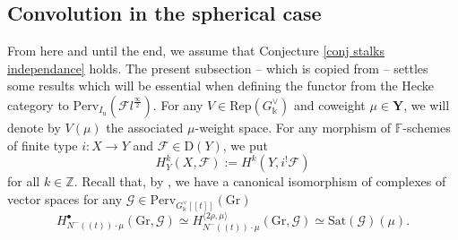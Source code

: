 \documentclass[11pt]{amsart}
\theoremstyle{plain}
\newtheorem{lem}[thm]{Lemma}
\theoremstyle{remark}
\numberwithin{equation}{section}
\begin{document}
	\subsection{Convolution in the spherical case} From here and until the end, we assume that Conjecture \ref{conj stalks independance} holds.  The present subsection -- which is copied from \cite[§5.2.3]{ABBGM} -- settles some results which will be essential when defining the functor from the Hecke category to $\mathrm{Perv}_{I_\mathrm{u}}(\mathcal{F}l^\frac{\infty}{2})$. For any $V\in\mathrm{Rep}(G^\vee_\mathbb{k})$ and coweight $\mu\in\mathbf{Y}$, we will denote by $V(\mu)$ the associated $\mu$-weight space. For any morphism of $\mathbb{F}$-schemes of finite type $i:X\to Y$  and $\mathcal{F}\in\mathrm{D}(Y)$, we put
 $$H^k_Y(X,\mathcal{F}):=H^k(Y,i^!\mathcal{F}) $$
 for all $k\in \mathbb{Z}$. Recall that,  by \cite{Mirkovic2004GeometricLD}, we have a canonical isomorphism of complexes of vector spaces for any $\mathcal{G}\in\mathrm{Perv}_{G^\vee_\mathbb{k}[[t]]}(\mathrm{Gr})$
	\begin{equation}\label{can iso}
		H_{N^-((t))\cdot \mu}^\bullet (\mathrm{Gr} ,\mathcal{G})\simeq H_{N^-((t))\cdot \mu}^{\langle{2\rho,\mu\rangle}}(\mathrm{Gr},\mathcal{G})\simeq \mathrm{Sat}(\mathcal{G})(\mu).
	\end{equation}
	
\end{document}
